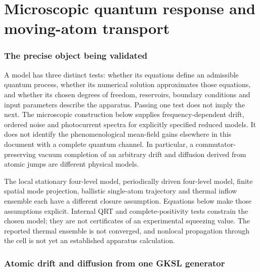 \documentclass[11pt,a4paper]{article}
\begin{document}
\part{Microscopic quantum response and moving-atom transport}
\label{part:gc-microscopic}

\section{The precise object being validated}
\label{sec:gc-contract}

A model has three distinct tests: whether its equations define an admissible
quantum process, whether its numerical solution approximates those equations,
and whether its chosen degrees of freedom, reservoirs, boundary conditions and
input parameters describe the apparatus. Passing one test does not imply the
next. The microscopic construction below supplies frequency-dependent drift,
ordered noise and photocurrent spectra for explicitly specified reduced models.
It does not identify the phenomenological mean-field gains elsewhere in this
document with a complete quantum channel. In particular, a commutator-preserving
vacuum completion of an arbitrary drift and diffusion derived from atomic jumps
are different physical models.

The local stationary four-level model, periodically driven four-level model,
finite spatial mode projection, ballistic single-atom trajectory and thermal
inflow ensemble each have a different closure assumption. Equations below make
those assumptions explicit. Internal QRT and complete-positivity tests constrain
the chosen model; they are not certificates of an experimental squeezing value.
The reported thermal ensemble is not converged, and nonlocal propagation through
the cell is not yet an established apparatus calculation.

\section{Atomic drift and diffusion from one GKSL generator}
\label{sec:gc-atomic}
\end{document}
